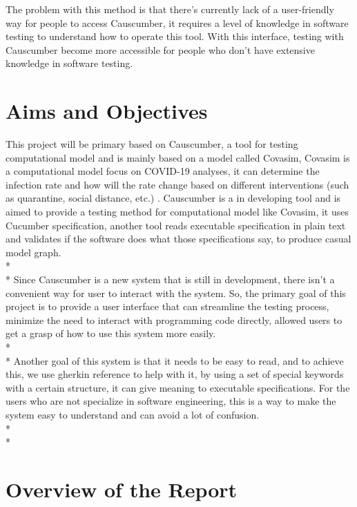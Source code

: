 The problem with this method is that there’s currently lack of a user-friendly way for people to access Causcumber, it requires a level of knowledge in software testing to understand how to operate this tool. With this interface, testing with Causcumber become more accessible for people who don’t have extensive knowledge in software testing.

\section{Aims and Objectives}

This project will be primary based on Causcumber, a tool for testing computational model and is mainly based on a model called Covasim, Covasim is a computational model focus on COVID-19 analyses, it can determine the infection rate and how will the rate change based on different interventions (such as quarantine, social distance, etc.) \cite{Reference4}. Causcumber is a in developing tool and is aimed to provide a testing method for computational model like Covasim, it uses Cucumber specification, another tool reads executable specification in plain text and validates if the software does what those specifications say, to produce casual model graph. \\*\\*
Since Causcumber is a new system that is still in development, there isn’t a convenient way for user to interact with the system. So, the primary goal of this project is to provide a user interface that can streamline the testing process, minimize the need to interact with programming code directly, allowed users to get a grasp of how to use this system more easily. \\*\\*
Another goal of this system is that it needs to be easy to read, and to achieve this, we use gherkin reference to help with it, by using a set of special keywords with a certain structure, it can give meaning to executable specifications. For the users who are not specialize in software engineering, this is a way to make the system easy to understand and can avoid a lot of confusion. \\*\\*



\section{Overview of the Report}

